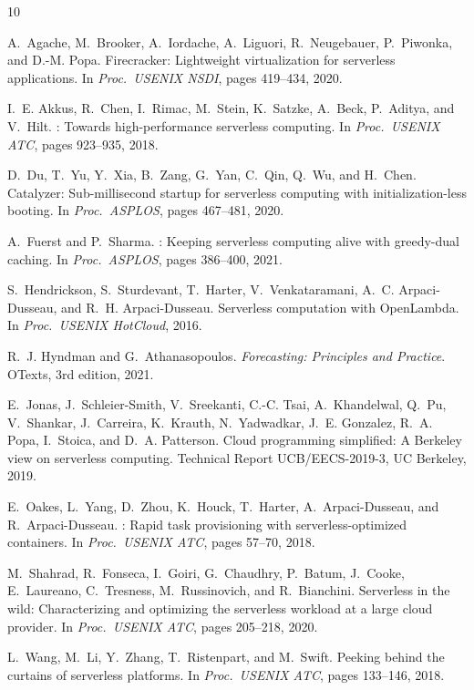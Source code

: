 \documentclass[10pt]{article}
\begin{document}
\begin{thebibliography}{10}

A.~Agache, M.~Brooker, A.~Iordache, A.~Liguori, R.~Neugebauer, P.~Piwonka,
  and D.-M. Popa.
\newblock Firecracker: Lightweight virtualization for serverless applications.
\newblock In \emph{Proc.\ USENIX NSDI}, pages 419--434, 2020.

I.~E. Akkus, R.~Chen, I.~Rimac, M.~Stein, K.~Satzke, A.~Beck, P.~Aditya, and
  V.~Hilt.
: Towards high-performance serverless computing.
\newblock In \emph{Proc.\ USENIX ATC}, pages 923--935, 2018.

D.~Du, T.~Yu, Y.~Xia, B.~Zang, G.~Yan, C.~Qin, Q.~Wu, and H.~Chen.
\newblock Catalyzer: Sub-millisecond startup for serverless computing with
  initialization-less booting.
\newblock In \emph{Proc.\ ASPLOS}, pages 467--481, 2020.

A.~Fuerst and P.~Sharma.
: Keeping serverless computing alive with greedy-dual
  caching.
\newblock In \emph{Proc.\ ASPLOS}, pages 386--400, 2021.

S.~Hendrickson, S.~Sturdevant, T.~Harter, V.~Venkataramani, A.~C.
  Arpaci-Dusseau, and R.~H. Arpaci-Dusseau.
\newblock Serverless computation with {OpenLambda}.
\newblock In \emph{Proc.\ USENIX HotCloud}, 2016.

R.~J. Hyndman and G.~Athanasopoulos.
\newblock \emph{Forecasting: Principles and Practice}.
\newblock OTexts, 3rd edition, 2021.

E.~Jonas, J.~Schleier-Smith, V.~Sreekanti, C.-C. Tsai, A.~Khandelwal, Q.~Pu,
  V.~Shankar, J.~Carreira, K.~Krauth, N.~Yadwadkar, J.~E. Gonzalez, R.~A.
  Popa, I.~Stoica, and D.~A. Patterson.
\newblock Cloud programming simplified: A {Berkeley} view on serverless
  computing.
\newblock Technical Report UCB/EECS-2019-3, UC Berkeley, 2019.

E.~Oakes, L.~Yang, D.~Zhou, K.~Houck, T.~Harter, A.~Arpaci-Dusseau, and
  R.~Arpaci-Dusseau.
: Rapid task provisioning with serverless-optimized
  containers.
\newblock In \emph{Proc.\ USENIX ATC}, pages 57--70, 2018.

M.~Shahrad, R.~Fonseca, I.~Goiri, G.~Chaudhry, P.~Batum, J.~Cooke,
  E.~Laureano, C.~Tresness, M.~Russinovich, and R.~Bianchini.
\newblock Serverless in the wild: Characterizing and optimizing the serverless
  workload at a large cloud provider.
\newblock In \emph{Proc.\ USENIX ATC}, pages 205--218, 2020.

L.~Wang, M.~Li, Y.~Zhang, T.~Ristenpart, and M.~Swift.
\newblock Peeking behind the curtains of serverless platforms.
\newblock In \emph{Proc.\ USENIX ATC}, pages 133--146, 2018.

\end{thebibliography}
\end{document}
